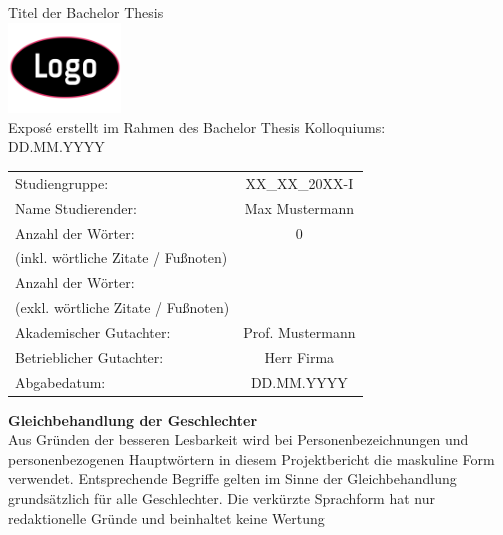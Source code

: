 \documentclass[a4paper,12pt]{scrartcl}
\author{Anisa Mecheraoui}
\newcommand{\myLarge}[1]{{\fontsize{20pt}{24pt}\selectfont\color{ba-blau}#1}}
\newcommand{\pageTitel}[1]{{\fontsize{14pt}{17pt}\selectfont\textbf{\color{ba-blau}#1}}}
\begin{document}
\thispagestyle{Deckblatt}

\begin{center}
    \myLarge {Titel der Bachelor Thesis} \\[3ex]
    \includegraphics[width=3cm]{Platzhalter_logo.png} \\[3ex]
    \large{Exposé erstellt im Rahmen des Bachelor Thesis Kolloquiums:
} \\
    \large{DD.MM.YYYY}
\end{center}

\renewcommand{\arraystretch}{2.5}
\begin{table}[h]
    \centering
    \begin{tabularx}{\textwidth}{l c}
        Studiengruppe: &  XX\_XX\_20XX-I \\
        Name Studierender: & Max Mustermann\\
        Anzahl der Wörter: & 0\\
        (inkl. wörtliche Zitate / Fußnoten) & ~ \\
        Anzahl der Wörter: & \\
        (exkl. wörtliche Zitate / Fußnoten) & ~ \\
        Akademischer Gutachter: & Prof. Mustermann\\
        Betrieblicher Gutachter: & Herr Firma\\
        Abgabedatum: & DD.MM.YYYY\\
    \end{tabularx}
\end{table}

\newpage

\pagestyle{style1}
\pageTitel{Gleichbehandlung der Geschlechter}\\
Aus Gründen der besseren Lesbarkeit wird bei Personenbezeichnungen und personenbezogenen Hauptwörtern in diesem Projektbericht die maskuline Form verwendet. Entsprechende Begriffe gelten im Sinne der Gleichbehandlung grundsätzlich für alle Geschlechter. Die verkürzte Sprachform hat nur redaktionelle Gründe und beinhaltet keine Wertung
\newpage
{}
\setcounter{page}{1}
\tableofcontents
\newpage
\listoffigures
\newpage
\listoftables
\newpage
\end{document}
